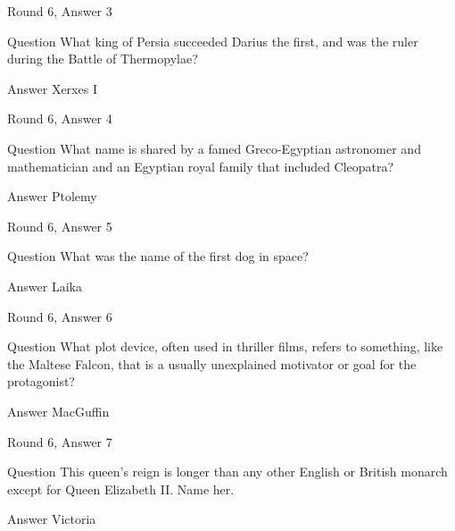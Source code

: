 \documentclass[11pt]{beamer}
\begin{document}
\begin{frame}[t]{Round 6, Answer 3}
\vspace{2em}
\begin{block}{Question}
What king of Persia succeeded Darius the first, and was the ruler during the Battle of Thermopylae\@?
\end{block}
\pause{}
\begin{block}{Answer}
Xerxes I
\end{block}
\end{frame}
    

\begin{frame}[t]{Round 6, Answer 4}
\vspace{2em}
\begin{block}{Question}
What name is shared by a famed Greco-Egyptian astronomer and mathematician and an Egyptian royal family that included Cleopatra\@?
\end{block}
\pause{}
\begin{block}{Answer}
Ptolemy
\end{block}
\end{frame}
    

\begin{frame}[t]{Round 6, Answer 5}
\vspace{2em}
\begin{block}{Question}
What was the name of the first dog in space\@?
\end{block}
\pause{}
\begin{block}{Answer}
Laika
\end{block}
\end{frame}
    

\begin{frame}[t]{Round 6, Answer 6}
\vspace{2em}
\begin{block}{Question}
What plot device, often used in thriller films, refers to something, like the Maltese Falcon, that is a usually unexplained motivator or goal for the protagonist\@?
\end{block}
\pause{}
\begin{block}{Answer}
MacGuffin
\end{block}
\end{frame}
    

\begin{frame}[t]{Round 6, Answer 7}
\vspace{2em}
\begin{block}{Question}
This queen's reign is longer than any other English or British monarch except for Queen Elizabeth II. Name her.
\end{block}
\pause{}
\begin{block}{Answer}
Victoria
\end{block}
\end{frame}
    
\end{document}
